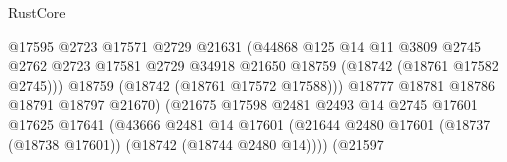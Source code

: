 \begin{lexlean}{RustCore}
\begin{coremodule}
                                                @17595
                                                @2723
                                                @17571
                                                @2729
                                                @21631
                                                (@44868
                                                  @125
                                                  @14
                                                  @11
                                                  @3809
                                                  @2745
                                                  @2762
                                                  @2723
                                                  @17581
                                                  @2729
                                                  @34918
                                                  @21650
                                                  @18759
                                                  (@18742 (@18761 @17582 @2745)))
                                                @18759
                                                (@18742 (@18761 @17572 @17588)))
                                              @18777
                                              @18781
                                              @18786
                                              @18791
                                              @18797
                                              @21670)
                                            (@21675
                                              @17598
                                              @2481
                                              @2493
                                              @14
                                              @2745
                                              @17601
                                              @17625
                                              @17641
                                              (@43666
                                                @2481
                                                @14
                                                @17601
                                                (@21644
                                                  @2480
                                                  @17601
                                                  (@18737 (@18738 @17601))
                                                  (@18742 (@18744 @2480 @14))))
                                              (@21597

\end{coremodule}
\end{lexlean}
